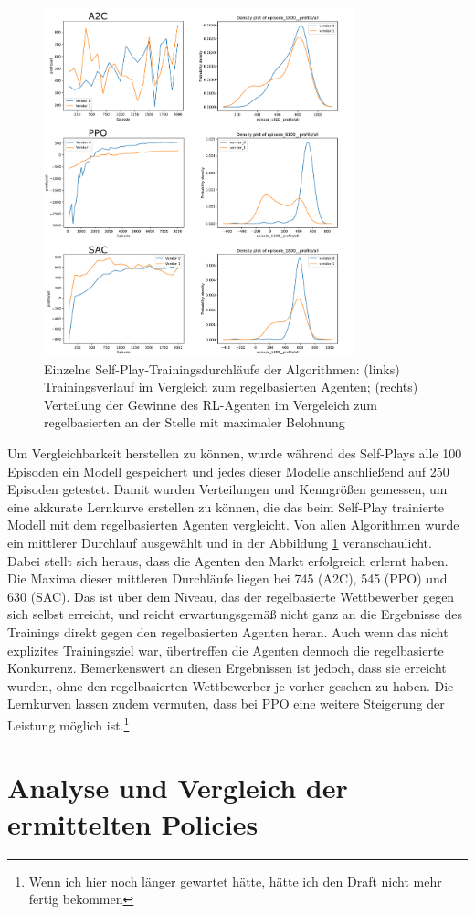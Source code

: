\begin{figure}[htbp]
	\centering
	\includegraphics[width=0.8\textwidth]{main/self_play_detailed.pdf}
	\caption{
        Einzelne Self-Play-Trainingsdurchläufe der Algorithmen:
        (links) Trainingsverlauf im Vergleich zum regelbasierten Agenten;
        (rechts) Verteilung der Gewinne des RL-Agenten im Vergeleich zum regelbasierten an der Stelle mit maximaler Belohnung
    }
	\label{grafic:SelfPlayDetails}
\end{figure}

Um Vergleichbarkeit herstellen zu können, wurde während des Self-Plays alle 100 Episoden ein Modell gespeichert und jedes dieser Modelle anschließend auf 250 Episoden getestet.
Damit wurden Verteilungen und Kenngrößen gemessen, um eine akkurate Lernkurve erstellen zu können, die das beim Self-Play trainierte Modell mit dem regelbasierten Agenten vergleicht.
Von allen Algorithmen wurde ein mittlerer Durchlauf ausgewählt und in der Abbildung \ref{grafic:SelfPlayDetails} veranschaulicht.
Dabei stellt sich heraus, dass die Agenten den Markt erfolgreich erlernt haben.
Die Maxima dieser mittleren Durchläufe liegen bei 745 (A2C), 545 (PPO) und 630 (SAC).
Das ist über dem Niveau, das der regelbasierte Wettbewerber gegen sich selbst erreicht, und reicht erwartungsgemäß nicht ganz an die Ergebnisse des Trainings direkt gegen den regelbasierten Agenten heran.
Auch wenn das nicht explizites Trainingsziel war, übertreffen die Agenten dennoch die regelbasierte Konkurrenz.
Bemerkenswert an diesen Ergebnissen ist jedoch, dass sie erreicht wurden, ohne den regelbasierten Wettbewerber je vorher gesehen zu haben.
Die Lernkurven lassen zudem vermuten, dass bei PPO eine weitere Steigerung der Leistung möglich ist.\footnote{Wenn ich hier noch länger gewartet hätte, hätte ich den Draft nicht mehr fertig bekommen}

\section{Analyse und Vergleich der ermittelten Policies}
